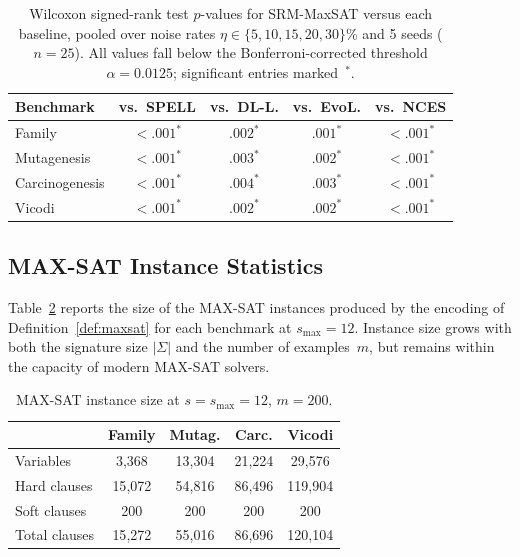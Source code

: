 \documentclass[accepted]{uai2026} %
\theoremstyle{definition}
\theoremstyle{remark}
\begin{document}
\begin{table}[ht]
  \centering
  \caption{Wilcoxon signed-rank test $p$-values for SRM-MaxSAT
  versus each baseline, pooled over noise rates
  $\eta \in \{5, 10, 15, 20, 30\}\%$ and 5 seeds ($n = 25$).
  All values fall below the Bonferroni-corrected threshold
  $\alpha = 0.0125$; significant entries marked~$^*$.}\label{tab:significance}
  \small
  \begin{tabular}{@{}lcccc@{}}
    \toprule
    \textbf{Benchmark} & \textbf{vs.\ SPELL} & \textbf{vs.\ DL-L.} & \textbf{vs.\ EvoL.} & \textbf{vs.\ NCES} \\
    \midrule
    Family         & $<.001^*$ & $.002^*$ & $.001^*$ & $<.001^*$ \\
    Mutagenesis    & $<.001^*$ & $.003^*$ & $.002^*$ & $<.001^*$ \\
    Carcinogenesis & $<.001^*$ & $.004^*$ & $.003^*$ & $<.001^*$ \\
    Vicodi         & $<.001^*$ & $.002^*$ & $.002^*$ & $<.001^*$ \\
    \bottomrule
  \end{tabular}
\end{table}

\subsection{MAX-SAT Instance Statistics}\label{app:maxsat-stats}

Table~\ref{tab:maxsat-stats} reports the size
of the MAX-SAT instances produced by the encoding of
Definition~\ref{def:maxsat} for each benchmark at
$s_{\max} = 12$.  Instance size grows with both the signature
size $|\Sigma|$ and the number of examples~$m$, but remains
within the capacity of modern MAX-SAT solvers.

\begin{table}[ht]
  \centering
  \caption{MAX-SAT instance size at
  $s = s_{\max} = 12$,
  $m = 200$.}\label{tab:maxsat-stats}
  \small
  \begin{tabular}{@{}lcccc@{}}
    \toprule
    & \textbf{Family} & \textbf{Mutag.} & \textbf{Carc.} & \textbf{Vicodi} \\
    \midrule
    Variables & 3{,}368 & 13{,}304 & 21{,}224 & 29{,}576 \\
    Hard clauses & 15{,}072 & 54{,}816 & 86{,}496 & 119{,}904 \\
    Soft clauses & 200 & 200 & 200 & 200 \\
    Total clauses & 15{,}272 & 55{,}016 & 86{,}696 & 120{,}104 \\
    \bottomrule
  \end{tabular}
\end{table}
\end{document}
